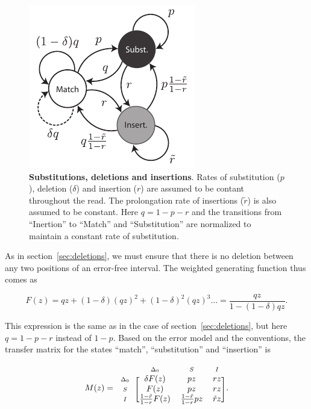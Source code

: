\documentclass{article}
\newcommand{\smI}{\scriptstyle{I}}
\newcommand{\smS}{\scriptstyle{S}}
\newcommand{\smDELz}{\scriptstyle{\Delta_0}}
\begin{document}
\begin{figure}[h]
\centering
\includegraphics[scale=0.9]{insertions.pdf}
\caption{\textbf{Substitutions, deletions and insertions}. Rates of
substitution ($p$), deletion ($\delta$) and insertion ($r$) are assumed to
be contant throughout the read. The prolongation rate of insertions
($\tilde{r}$) is also assumed to be constant. Here $q = 1-p-r$ and the
transitions from ``Inertion'' to ``Match'' and ``Substitution'' are
normalized to maintain a constant rate of substitution.}
\label{fig:insertions}
\end{figure}

As in section~\ref{sec:deletions}, we must ensure that there is no deletion
between any two positions of an error-free interval. The weighted
generating function thus comes as

\begin{equation*}
F(z) = qz + (1-\delta)(qz)^2 + (1-\delta)^2(qz)^3 \ldots =
\frac{qz}{1-(1-\delta)qz}.
\end{equation*}

This expression is the same as in the case of section~\ref{sec:deletions},
but here $q = 1-p-r$ instead of $1-p$. Based on the error model and the
conventions, the transfer matrix for the states ``match'',
``substitution'' and ``insertion'' is

\begin{equation*}
M(z) = 
\begin{blockarray}{cccc}
       & \smDELz & \smS & \smI \\
\begin{block}{c[ccc]}
\smDELz & \delta F(z) & pz & rz \\
\smS    &        F(z) & pz & rz \\
\smI    & \frac{1-\tilde{r}}{1-r}F(z)
           & \frac{1-\tilde{r}}{1-r}pz & \tilde{r}z \\
\end{block}
\end{blockarray}.
\end{equation*}
\end{document}
